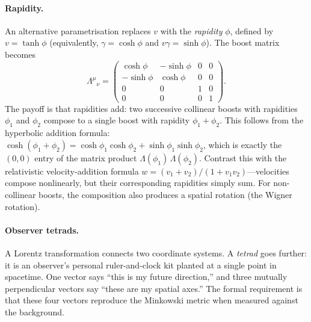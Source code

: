 \paragraph{Rapidity.}

An alternative parametrisation replaces $v$ with the \emph{rapidity} $\phi$,
defined by $v = \tanh\phi$ (equivalently, $\gamma = \cosh\phi$ and $v\gamma =
\sinh\phi$).  The boost matrix becomes
%
\begin{equation}
  \Lambda^\mu{}_\nu
    = \begin{pmatrix}
        \cosh\phi  & -\sinh\phi & 0 & 0 \\
        -\sinh\phi & \cosh\phi  & 0 & 0 \\
        0          & 0          & 1 & 0 \\
        0          & 0          & 0 & 1
      \end{pmatrix} .
  \label{eq:boost-rapidity}
\end{equation}
%
The payoff is that rapidities add: two successive collinear boosts with
rapidities $\phi_1$ and $\phi_2$ compose to a single boost with rapidity
$\phi_1 + \phi_2$.  This follows from the hyperbolic addition formula:
$\cosh(\phi_1 + \phi_2) = \cosh\phi_1\cosh\phi_2 + \sinh\phi_1\sinh\phi_2$,
which is exactly the $(0,0)$ entry of the matrix product
$\Lambda(\phi_1)\,\Lambda(\phi_2)$.  Contrast this with the relativistic
velocity-addition formula $w = (v_1 + v_2)/(1 + v_1 v_2)$---velocities compose
nonlinearly, but their corresponding rapidities simply sum.  For non-collinear
boosts, the composition also produces a spatial rotation (the Wigner rotation).

\paragraph{Observer tetrads.}

A Lorentz transformation connects two coordinate systems.  A \emph{tetrad}
goes further: it is an observer's personal ruler-and-clock kit planted at a
single point in spacetime.  One vector says ``this is my future direction,'' and
three mutually perpendicular vectors say ``these are my spatial axes.''  The
formal requirement is that these four vectors reproduce the Minkowski metric
when measured against the background.


